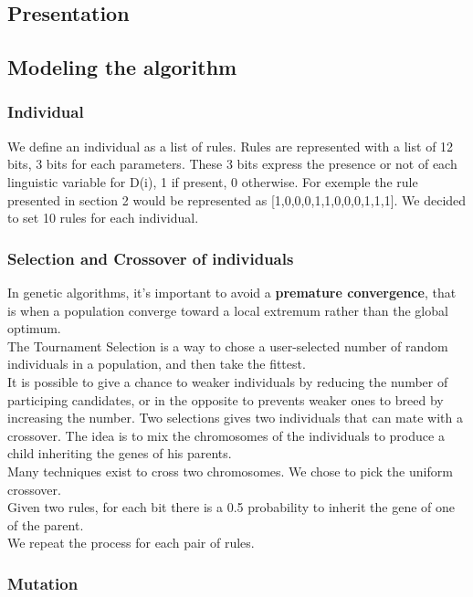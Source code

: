 \documentclass[a4paper,12pt]{article}
\begin{document}
\subsection{Presentation}

\subsection{Modeling the algorithm}

\subsubsection{Individual}

We define an individual as a list of rules. Rules are represented with a list of 12 bits, 3 bits for each parameters.
These 3 bits express the presence or not of each linguistic variable for D(i), 1 if present, 0 otherwise.
For exemple the rule presented in section 2 would be represented as [1,0,0,0,1,1,0,0,0,1,1,1].
We decided to set 10 rules for each individual.

\subsubsection{Selection and Crossover of individuals}

In genetic algorithms, it's important to avoid a \textbf{premature convergence}, that is when a population converge toward a local extremum rather than the global optimum. \\
The Tournament Selection is a way to chose a user-selected number of random individuals in a population, and then take the fittest.\\
It is possible to give a chance to weaker individuals by reducing the number of participing candidates, or in the opposite to prevents weaker ones to breed by increasing the number.
Two selections gives two individuals that can mate with a crossover.
The idea is to mix the chromosomes of the individuals to produce a child inheriting the genes of his parents.\\
Many techniques exist to cross two chromosomes. We chose to pick the uniform crossover.\\
Given two rules, for each bit there is a 0.5 probability to inherit the gene of one of the parent.\\
We repeat the process for each pair of rules.

\subsubsection{Mutation}
\end{document}
